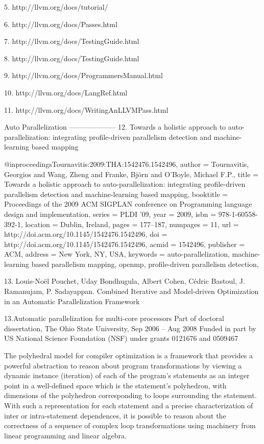 5. http://llvm.org/docs/tutorial/

6. http://llvm.org/docs/Passes.html

7. http://llvm.org/docs/TestingGuide.html

8. http://llvm.org/docs/TestingGuide.html

9. http://llvm.org/docs/ProgrammersManual.html

10. http://llvm.org/docs/LangRef.html

11. http://llvm.org/docs/WritingAnLLVMPass.html

Auto Parallelization
--------------------
12. Towards a holistic approach to auto-parallelization: integrating profile-driven parallelism detection and machine-learning based mapping

@inproceedings{Tournavitis:2009:THA:1542476.1542496,
    author = {Tournavitis, Georgios and Wang, Zheng and Franke, Bj\"{o}rn and O'Boyle, Michael F.P.},
    title = {Towards a holistic approach to auto-parallelization: integrating profile-driven parallelism detection and machine-learning based mapping},
    booktitle = {Proceedings of the 2009 ACM SIGPLAN conference on Programming language design and implementation},
    series = {PLDI '09},
    year = {2009},
    isbn = {978-1-60558-392-1},
    location = {Dublin, Ireland},
    pages = {177--187},
    numpages = {11},
    url = {http://doi.acm.org/10.1145/1542476.1542496},
    doi = {http://doi.acm.org/10.1145/1542476.1542496},
    acmid = {1542496},
    publisher = {ACM},
    address = {New York, NY, USA},
    keywords = {auto-parallelization, machine-learning based parallelism mapping, openmp, profile-driven parallelism detection},
} 

13.  Louis-Noël Pouchet, Uday Bondhugula, Albert Cohen, Cédric Bastoul, J. Ramanujam, P. Sadayappan. Combined Iterative and Model-driven Optimization in an Automatic Parallelization Framework


13.Automatic parallelization for multi-core processors
Part of doctoral dissertation, The Ohio State University, Sep 
2006 -- Aug 2008
Funded in part by US National Science Foundation (NSF) under 
grants 0121676 and 0509467

The polyhedral model for compiler optimization is a framework that 
provides a powerful abstraction to reason about program transformations 
by viewing a dynamic instance (iteration) of each of the program's 
statements as an integer point in a well-defined space which is the 
statement's  polyhedron, with dimensions of the polyhedron corresponding 
to loops surrounding the statement. With such a representation for each 
statement and a precise characterization of inter or intra-statement 
dependences, it is possible to reason about the correctness of a sequence 
of complex loop transformations using machinery from linear programming 
and linear algebra.


